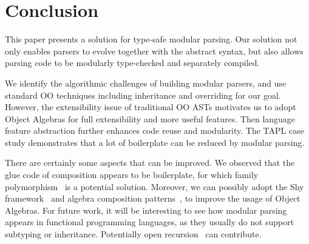\section{Conclusion}\label{sec:conclusion}

This paper presents a solution for type-safe modular parsing. Our solution
not only enables parsers to evolve together with the abstract syntax,
but also allows parsing code to be modularly type-checked and separately compiled.

We identify the algorithmic challenges of building modular parsers,
and use standard OO techniques including inheritance and overriding
for our goal. However, the extensibility issue of
traditional OO ASTs motivates us to adopt Object Algebras for full
extensibility and more useful features. Then language feature abstraction further enhances code reuse and modularity.
The TAPL case study demonstrates that a lot of boilerplate can be reduced by
modular parsing.

There are certainly some aspects that can be improved. We observed that the
glue code of composition appears to be boilerplate, for which family polymorphism~\cite{ernst01FP}
is a potential solution. Moreover, we can possibly
adopt the Shy framework~\cite{Zhang2015} and algebra composition
patterns~\cite{oliveira2013feature}, to improve the usage of Object
Algebras. For future work, it will be interesting to see how modular parsing
appears in functional programming languages, as they usually do not support subtyping
or inheritance. Potentially open recursion~\cite{CookThesis} can contribute.
